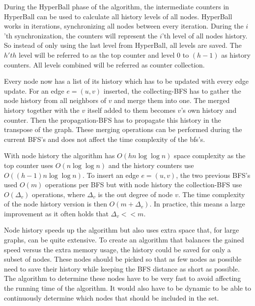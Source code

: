 During the HyperBall phase of the algorithm, the intermediate counters in HyperBall can be used to calculate all history levels of all nodes. HyperBall works in iterations, synchronizing all nodes between every iteration. During the $i$'th synchronization, the counters will represent the $i$'th level of all nodes history. So instead of only using the last level from HyperBall, all levels are saved. The $h'th$ level will be referred to as the top counter and level $0$ to $(h-1)$ as history counters. All levels combined will be referred as counter collection.  

Every node now has a list of its history which has to be updated with every edge update. For an edge $e = (u,v)$ inserted, the collecting-BFS has to gather the node history from all neighbors of $v$ and merge them into one. The merged history together with the $v$ itself added to them becomes $v$'s own history and counter. Then the propagation-BFS has to propagate this history in the transpose of the graph. These merging operations can be performed during the current BFS's and does not affect the time complexity of the bfs's.

With node history the algorithm has $O(hn \log \log n)$ space complexity as the top counter uses $O(n \log \log n)$ and the history counters use $O((h-1)n \log \log n)$. To insert an edge $e = (u,v)$, the two previous BFS's used $O(m)$ operations per BFS but with node history the collection-BFS use $O(\Delta_v)$ operations, where $\Delta_v$ is the out degree of node $v$. The time complexity of the node history version is then $O(m + \Delta_v)$. In practice, this means a large improvement as it often holds that $\Delta_v << m$.

Node history speeds up the algorithm but also uses extra space that, for large graphs, can be quite extensive. To create an algorithm that balances the gained speed versus the extra memory usage, the history could be saved for only a subset of nodes. These nodes should be picked so that as few nodes as possible need to save their history while keeping the BFS distance as short as possible. The algorithm to determine these nodes have to be very fast to avoid affecting the running time of the algorithm. It would also have to be dynamic to be able to continuously determine which nodes that should be included in the set.

